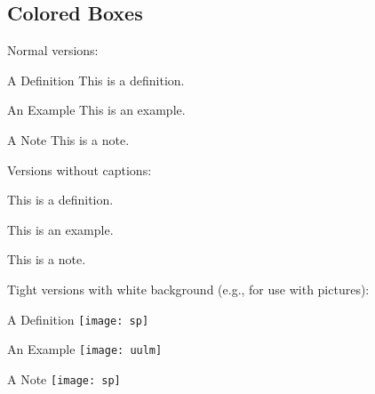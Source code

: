 \documentclass[
	aspectratio=169, %
	8pt, %
]{beamer}
\begin{document}
\subsection{Colored Boxes}
\begin{frame}{\insertsubsection}
	Normal versions:
	\begin{mycolumns}[columns=3]
		\begin{definition}{A Definition}
			This is a definition.
		\end{definition}
	\mynextcolumn
		\begin{example}{An Example}
			This is an example.
		\end{example}
	\mynextcolumn
		\begin{note}{A Note}
			This is a note.
		\end{note}
	\end{mycolumns}
	\vfill
	Versions without captions:
	\begin{mycolumns}[columns=3]
		\begin{definition}{}
			This is a definition.
		\end{definition}
	\mynextcolumn
		\begin{example}{}
			This is an example.
		\end{example}
	\mynextcolumn
		\begin{note}{}
			This is a note.
		\end{note}
	\end{mycolumns}
	\vfill
	Tight versions with white background (e.g., for use with pictures):
	\begin{mycolumns}[columns=3]
		\begin{definitiontight}{A Definition}
			\texttt{[image: sp]}
		\end{definitiontight}
	\mynextcolumn
		\begin{exampletight}{An Example}
			\texttt{[image: uulm]}
		\end{exampletight}
	\mynextcolumn
		\begin{notetight}{A Note}
			\texttt{[image: sp]}
		\end{notetight}
	\end{mycolumns}
\end{frame}
\end{document}
